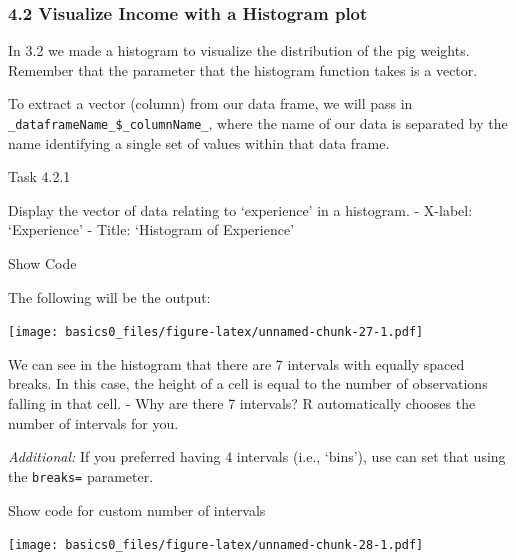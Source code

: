 \documentclass[
]{article}
\newenvironment{Shaded}{\begin{snugshade}}{\end{snugshade}}
\newcommand{\AttributeTok}[1]{\textcolor[rgb]{0.13,0.29,0.53}{#1}}
\newcommand{\CommentTok}[1]{\textcolor[rgb]{0.56,0.35,0.01}{\textit{#1}}}
\newcommand{\DecValTok}[1]{\textcolor[rgb]{0.00,0.00,0.81}{#1}}
\newcommand{\FunctionTok}[1]{\textcolor[rgb]{0.13,0.29,0.53}{\textbf{#1}}}
\newcommand{\NormalTok}[1]{#1}
\newcommand{\SpecialCharTok}[1]{\textcolor[rgb]{0.81,0.36,0.00}{\textbf{#1}}}
\newcommand{\StringTok}[1]{\textcolor[rgb]{0.31,0.60,0.02}{#1}}
\begin{document}
\hypertarget{visualize-income-with-a-histogram-plot}{%
\subsubsection{4.2 Visualize Income with a Histogram
plot}\label{visualize-income-with-a-histogram-plot}}

In 3.2 we made a histogram to visualize the distribution of the pig
weights. Remember that the parameter that the histogram function takes
is a vector.

To extract a vector (column) from our data frame, we will pass in
\texttt{\_dataframeName\_\$\_columnName\_}, where the name of our data
is separated by the name identifying a single set of values within that
data frame.

Task 4.2.1

Display the vector of data relating to `experience' in a histogram. -
X-label: `Experience' - Title: `Histogram of Experience'

Show Code

\begin{Shaded}
\end{Shaded}

The following will be the output:

\texttt{[image: basics0\_files/figure-latex/unnamed-chunk-27-1.pdf]}

We can see in the histogram that there are 7 intervals with equally
spaced breaks. In this case, the height of a cell is equal to the number
of observations falling in that cell. - Why are there 7 intervals? R
automatically chooses the number of intervals for you.

\emph{Additional:} If you preferred having 4 intervals (i.e., `bins'),
use can set that using the
\texttt{breaks=\textquotesingle{}\textquotesingle{}} parameter.

Show code for custom number of intervals

\begin{Shaded}
\end{Shaded}

\texttt{[image: basics0\_files/figure-latex/unnamed-chunk-28-1.pdf]}
\end{document}
